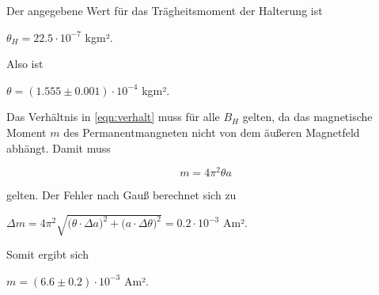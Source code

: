 Der angegebene Wert für das Trägheitsmoment der Halterung ist

\vspace{.5em}
\centerline{$\theta_H = 22.5 \cdot 10^{-7}$ kgm².}
\vspace{.5em}

Also ist

\vspace{.5em}
\centerline{$\theta = (1.555 \pm 0.001) \cdot 10^{-4}$ kgm².}
\vspace{.5em}

Das Verhältnis in \eqref{eqn:verhalt} muss für alle $B_H$ gelten, da das magnetische Moment $m$ des Permanentmangneten nicht von dem äußeren Magnetfeld abhängt.
Damit muss

\begin{equation}
  m = 4 \pi^2 \theta a
\end{equation}

gelten. Der Fehler nach Gauß berechnet sich zu

\vspace{.5em}
\centerline{$\Delta m = 4 \pi^2 \sqrt{ \bigg( \theta \cdot \Delta a \bigg)^2 + \bigg( a \cdot \Delta \theta \bigg)^2 } = 0.2 \cdot 10^{-3}$ Am².}
\vspace{.5em}

Somit ergibt sich

\vspace{.5em}
\centerline{$m = (6.6 \pm 0.2) \cdot 10^{-3}$ Am².}
\vspace{.5em}